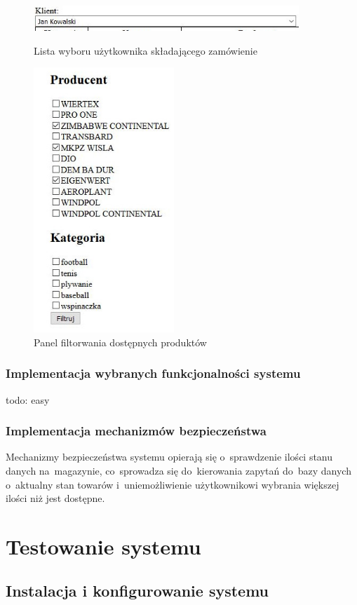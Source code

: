 \documentclass[a4paper, 12pt]{article}
\begin{document}
\begin{figure}[H]
	\centering
	\includegraphics[width=10cm]{Screeny/listaRozwijana.JPG}
	\caption[Lista wyboru użytkownika]{Lista wyboru użytkownika składającego zamówienie}
	\label{fig:listaRozwijana}
	
	\centering
	\includegraphics[height=10cm]{Screeny/panelFiltrowania.JPG}
	\caption[Panel filtorwania dostępnych produktów]{Panel filtorwania dostępnych produktów}
	\label{fig:panelFiltrowaniaProduktów}
\end{figure}

\subsubsection{Implementacja wybranych funkcjonalności systemu}
todo: easy
\subsubsection{Implementacja mechanizmów bezpieczeństwa}
Mechanizmy bezpieczeństwa systemu opierają się o~sprawdzenie ilości stanu danych na~magazynie, co~sprowadza się do~kierowania zapytań do~bazy danych o~aktualny stan towarów i~uniemożliwienie użytkownikowi wybrania większej ilości niż jest dostępne.
\section{Testowanie systemu}
\subsection{Instalacja i konfigurowanie systemu}
\end{document}
